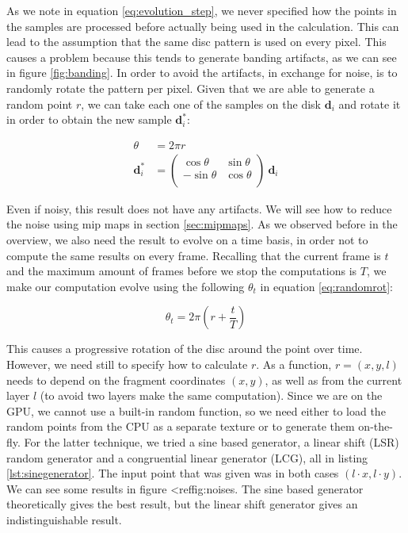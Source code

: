 As we note in equation \ref{eq:evolution_step}, we never specified how the points in the samples are processed before actually being used in the calculation. This can lead to the assumption that the same disc pattern is used on every pixel. This causes a problem because this tends to generate banding artifacts, as we can see in figure \ref{fig:banding}. In order to avoid the artifacts, in exchange for noise, is to randomly rotate the pattern per pixel. Given that we are able to generate a random point $r$, we can take each one of the samples on the disk $\mathbf{d}_i$ and rotate it in order to obtain the new sample $\mathbf{d}_i^*$:

\renewcommand{\arraystretch}{1}
\begin{equation}
\begin{split}
\theta &= 2 \pi r \\
\mathbf{d}_i^* &= \left(\begin{array}{cc}
\cos\theta & \sin\theta \\
-\sin\theta & \cos\theta \\
\end{array} \right) \ \mathbf{d}_i
\end{split}
\label{eq:randomrot}
\end{equation}
\renewcommand{\arraystretch}{1.8}

Even if noisy, this result does not have any artifacts. We will see how to reduce the noise using mip maps in section \ref{sec:mipmaps}. As we observed before in the overview, we also need the result to evolve on a time basis, in order not to compute the same results on every frame. Recalling that the current frame is $t$ and the maximum amount of frames before we stop the computations is $T$, we make our computation evolve using the following $\theta_t$ in equation \ref{eq:randomrot}:

$$
\theta_t = 2 \pi \left(r + \frac{t}{T}\right)
$$

This causes a progressive rotation of the disc around the point over time. However, we need still to specify how to calculate $r$. As a function, $r = (x,y,l)$ needs to depend on the fragment coordinates $(x,y)$, as well as from the current layer $l$ (to avoid two layers make the same computation). Since we are on the GPU, we cannot use a built-in random function, so we need either to load the random points from the CPU as a separate texture or to generate them on-the-fly. For the latter technique, we tried a sine based generator, a linear shift (LSR) random generator and a congruential linear generator (LCG), all in listing \ref{lst:sinegenerator}. The input point that was given was in both cases $(l \cdot x, l \cdot y)$. We can see some results in figure <ref{fig:noises}. The sine based generator theoretically gives the best result, but the linear shift generator gives an indistinguishable result.

